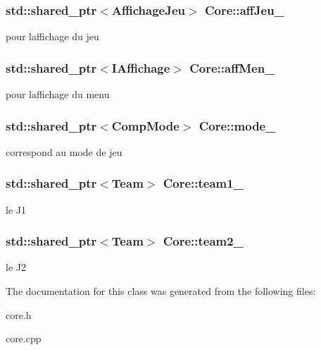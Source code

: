 \subsubsection[{\texorpdfstring{aff\+Jeu\+\_\+}{affJeu_}}]{\setlength{\rightskip}{0pt plus 5cm}std\+::shared\+\_\+ptr$<${\bf Affichage\+Jeu}$>$ Core\+::aff\+Jeu\+\_\+\hspace{0.3cm}{\ttfamily [protected]}}\hypertarget{class_core_a2558f752fb1c060782d4f75d9d09b864}{}\label{class_core_a2558f752fb1c060782d4f75d9d09b864}
pour l\textquotesingle{}affichage du jeu 
\subsubsection[{\texorpdfstring{aff\+Men\+\_\+}{affMen_}}]{\setlength{\rightskip}{0pt plus 5cm}std\+::shared\+\_\+ptr$<${\bf I\+Affichage}$>$ Core\+::aff\+Men\+\_\+\hspace{0.3cm}{\ttfamily [protected]}}\hypertarget{class_core_a2d9a9ba8be0844338f67e8feab39ba9e}{}\label{class_core_a2d9a9ba8be0844338f67e8feab39ba9e}
pour l\textquotesingle{}affichage du menu 
\subsubsection[{\texorpdfstring{mode\+\_\+}{mode_}}]{\setlength{\rightskip}{0pt plus 5cm}std\+::shared\+\_\+ptr$<${\bf Comp\+Mode}$>$ Core\+::mode\+\_\+\hspace{0.3cm}{\ttfamily [protected]}}\hypertarget{class_core_ab7d2af28daa772c12d0a2cea6e65f887}{}\label{class_core_ab7d2af28daa772c12d0a2cea6e65f887}
correspond au mode de jeu 
\subsubsection[{\texorpdfstring{team1\+\_\+}{team1_}}]{\setlength{\rightskip}{0pt plus 5cm}std\+::shared\+\_\+ptr$<${\bf Team}$>$ Core\+::team1\+\_\+\hspace{0.3cm}{\ttfamily [protected]}}\hypertarget{class_core_a299a0b1ed101953462d17c6e0528b006}{}\label{class_core_a299a0b1ed101953462d17c6e0528b006}
le J1 
\subsubsection[{\texorpdfstring{team2\+\_\+}{team2_}}]{\setlength{\rightskip}{0pt plus 5cm}std\+::shared\+\_\+ptr$<${\bf Team}$>$ Core\+::team2\+\_\+\hspace{0.3cm}{\ttfamily [protected]}}\hypertarget{class_core_a4e9f0791fb0449a8c4b0ccce607a11da}{}\label{class_core_a4e9f0791fb0449a8c4b0ccce607a11da}
le J2 

The documentation for this class was generated from the following files\+:\begin{DoxyCompactItemize}
\item 
core.\+h\item 
core.\+cpp\end{DoxyCompactItemize}
